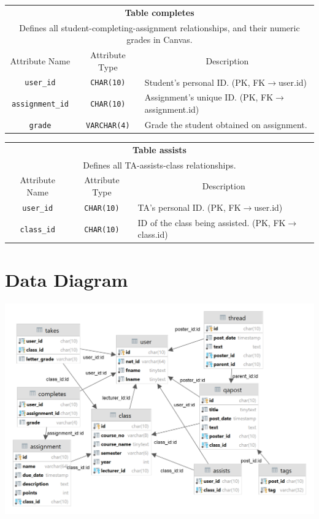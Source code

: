 \documentclass{paper}
\begin{document}
\begin{center}
		\begin{tabular}{c | c | l}
			\toprule
			\multicolumn{3}{c}{\textbf{Table completes}} \\
			\multicolumn{3}{c}{Defines all student-completing-assignment relationships, and their numeric grades in Canvas.}\\
			\midrule
			Attribute Name & Attribute Type & \multicolumn{1}{c}{Description} \\
			\verb|user_id| & \verb|CHAR(10)| & Student's personal ID. (PK, FK$\to$user.id) \\
			\verb|assignment_id| & \verb|CHAR(10)| & Assignment's unique ID. (PK, FK$\to$assignment.id) \\
			\verb|grade| & \verb|VARCHAR(4)| & Grade the student obtained on assignment. \\
			\bottomrule
		\end{tabular}\vspace{1.5em}
	
		\begin{tabular}{c | c | l}
			\toprule
			\multicolumn{3}{c}{\textbf{Table assists}} \\
			\multicolumn{3}{c}{Defines all TA-assists-class relationships.}\\
			\midrule
			Attribute Name & Attribute Type & \multicolumn{1}{c}{Description} \\
			\verb|user_id| & \verb|CHAR(10)| & TA's personal ID. (PK, FK$\to$user.id)\\
			\verb|class_id| & \verb|CHAR(10)| & ID of the class being assisted. (PK, FK$\to$class.id) \\
			\bottomrule
		\end{tabular}

	\end{center}

	\section{Data Diagram}
	\includegraphics[scale=0.3]{canvas_db.png}
	
\end{document}

